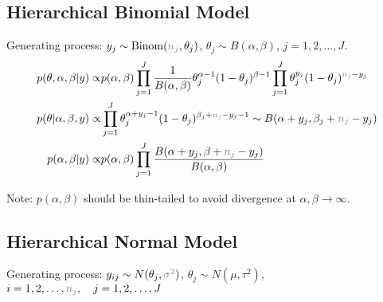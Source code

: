 \subsection{Hierarchical Binomial Model}\label{SubSubSectionBayesianHierarchicalBinom}
Generating process: $ y_j\sim \mathrm{ Binom }(\fixed{n_j},\theta _j)  $, $ \theta _j\sim B(\alpha ,\beta ) $, $ j=1,2,\ldots, J $.
\begin{align}
    p(\theta ,\alpha ,\beta |y)\propto & p(\alpha ,\beta )\prod_{j=1}^J\dfrac{ 1 }{ B(\alpha ,\beta ) }\theta _j^{\alpha -1}(1-\theta _j)^{\beta -1}\prod_{j=1}^J\theta _j^{y_j}(1-\theta _j)^{\fixed{n_j}-y_j}\\
    p(\theta |\alpha ,\beta ,y)\propto & \prod_{j=1}^J\theta_j ^{\alpha +y_j-1}(1-\theta _j)^{\beta _j+\fixed{n_j}-y_j-1}\sim B(\alpha +y_j, \beta _j+\fixed{n_j}-y_j)\\
    p(\alpha ,\beta |y)\propto & p(\alpha ,\beta )\prod_{j=1}^J\dfrac{ B(\alpha +y_j, \beta +\fixed{n_j}-y_j) }{ B(\alpha ,\beta ) }  
\end{align}

    Note: $ p(\alpha ,\beta ) $ should be thin-tailed to avoid divergence at $ \alpha ,\beta \to\infty $.


    




\subsection{Hierarchical Normal Model}\label{SubSubSectionBayesianHierarchicalNormal}

Generating process: $ y_{ij}\sim N(\theta  _j,\fixed{\sigma ^2})  $, $ \theta _j\sim N(\mu ,\tau^2 ) $, $ i=1,2,\ldots,\fixed{n_j},\quad j=1,2,\ldots, J $


